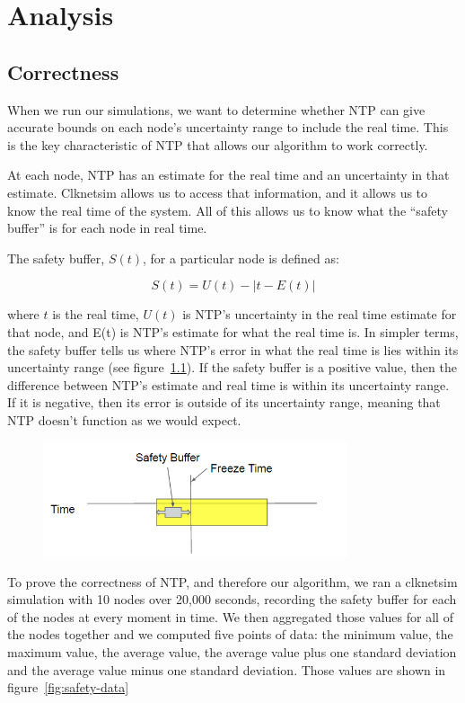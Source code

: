 \chapter{Analysis}
\label{sec:analysis}

\section{Correctness}

When we run our simulations, we want to determine whether NTP can give
accurate bounds on each node’s uncertainty range to include the real
time. This is the key characteristic of NTP that allows our algorithm
to work correctly.

At each node, NTP has an estimate for the real time and an uncertainty
in that estimate. Clknetsim allows us to access that information, and
it allows us to know the real time of the system. All of this allows
us to know what the “safety buffer” is for each node in real time.

The safety buffer, $S(t)$,  for a particular node is defined as:

\[ S(t) = U(t) - | t - E(t)| \]

where $t$ is the real time, $U(t)$ is NTP’s uncertainty in the real
time estimate for that node, and E(t) is NTP’s estimate for what the
real time is. In simpler terms, the safety buffer tells us where NTP’s
error in what the real time is lies within its uncertainty range (see
figure~\ref{fig:safety-diag}). If the safety buffer is a positive
value, then the difference between NTP’s estimate and real time is
within its uncertainty range. If it is negative, then its error is
outside of its uncertainty range, meaning that NTP doesn’t function as
we would expect.

\begin{figure}[h]
  \caption{} %
  \label{fig:safety-diag}
  \centering
  \includegraphics[width=0.8\textwidth]{safety-diagram.png}
\end{figure}

To prove the correctness of NTP, and therefore our algorithm, we ran a
clknetsim simulation with 10 nodes over 20,000 seconds, 
recording the safety buffer for each of the nodes at
every moment in time. We then aggregated those values for all of the
nodes together and we computed five points of data: the minimum value,
the maximum value, the average value, the average value plus one
standard deviation and the average value minus one standard
deviation. Those values are shown in figure~\ref{fig:safety-data}

